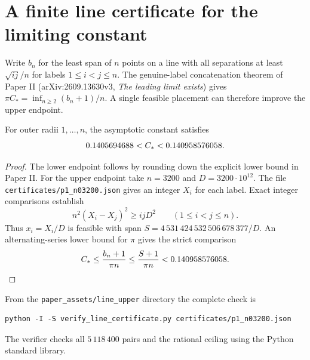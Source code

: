 \section*{A finite line certificate for the limiting constant}

Write $b_n$ for the least span of $n$ points on a line with all
separations at least $\sqrt{ij}/n$ for labels $1\le i<j\le n$.
The genuine-label concatenation theorem of Paper II
(arXiv:2609.13630v3, \emph{The leading limit exists})
gives $\pi C_*=\inf_{n\ge2}(b_n+1)/n$.
A single feasible placement can therefore improve the upper endpoint.

\begin{proposition}
For outer radii $1,\ldots,n$, the asymptotic constant satisfies
\[
                 0.1405694688<C_*<0.140958576058 .
\]
\end{proposition}
\begin{proof}
The lower endpoint follows by rounding down the explicit lower bound in
Paper II. For the upper endpoint take $n=3200$ and
$D=3200\cdot10^{12}$. The file
\texttt{certificates/p1\_n03200.json} gives an integer $X_i$ for each label.
Exact integer comparisons establish
\[
 n^2(X_i-X_j)^2\ge ijD^2\qquad (1\le i<j\le n).
\]
Thus $x_i=X_i/D$ is feasible with span
$S=4\,531\,424\,532\,506\,678\,377/D$.
An alternating-series lower bound for $\pi$ gives the strict comparison
\[
 C_*\le\frac{b_n+1}{\pi n}\le\frac{S+1}{\pi n}<0.140958576058.
\]
\end{proof}

From the \texttt{paper\_assets/line\_upper} directory the complete check is
\begin{verbatim}
python -I -S verify_line_certificate.py certificates/p1_n03200.json
\end{verbatim}
The verifier checks all $5\,118\,400$ pairs and the rational ceiling using
the Python standard library.
